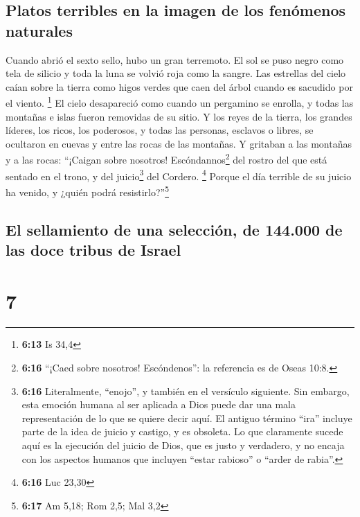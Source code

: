 \hypertarget{platos-terribles-en-la-imagen-de-los-fenuxf3menos-naturales}{%
\subsection{Platos terribles en la imagen de los fenómenos
naturales}\label{platos-terribles-en-la-imagen-de-los-fenuxf3menos-naturales}}

 Cuando abrió el sexto sello, hubo un gran terremoto. El
sol se puso negro como tela de silicio y toda la luna se volvió roja
como la sangre.  Las estrellas del cielo caían sobre la
tierra como higos verdes que caen del árbol cuando es sacudido por el
viento. \footnote{\textbf{6:13} Is 34,4}  El cielo
desapareció como cuando un pergamino se enrolla, y todas las montañas e
islas fueron removidas de su sitio.  Y los reyes de la
tierra, los grandes líderes, los ricos, los poderosos, y todas las
personas, esclavos o libres, se ocultaron en cuevas y entre las rocas de
las montañas.  Y gritaban a las montañas y a las rocas:
``¡Caigan sobre nosotros! Escóndannos\footnote{\textbf{6:16} ``¡Caed
  sobre nosotros! Escóndenos'': la referencia es de Oseas 10:8.} del
rostro del que está sentado en el trono, y del juicio\footnote{\textbf{6:16}
  Literalmente, ``enojo'', y también en el versículo siguiente. Sin
  embargo, esta emoción humana al ser aplicada a Dios puede dar una mala
  representación de lo que se quiere decir aquí. El antiguo término
  ``ira'' incluye parte de la idea de juicio y castigo, y es obsoleta.
  Lo que claramente sucede aquí es la ejecución del juicio de Dios, que
  es justo y verdadero, y no encaja con los aspectos humanos que
  incluyen ``estar rabioso'' o ``arder de rabia''.} del Cordero.
\footnote{\textbf{6:16} Luc 23,30}  Porque el día
terrible de su juicio ha venido, y ¿quién podrá resistirlo?''\footnote{\textbf{6:17}
  Am 5,18; Rom 2,5; Mal 3,2}

\hypertarget{el-sellamiento-de-una-selecciuxf3n-de-144.000-de-las-doce-tribus-de-israel}{%
\subsection{El sellamiento de una selección, de 144.000 de las doce
tribus de
Israel}\label{el-sellamiento-de-una-selecciuxf3n-de-144.000-de-las-doce-tribus-de-israel}}

\hypertarget{section-6}{%
\section{7}\label{section-6}}

